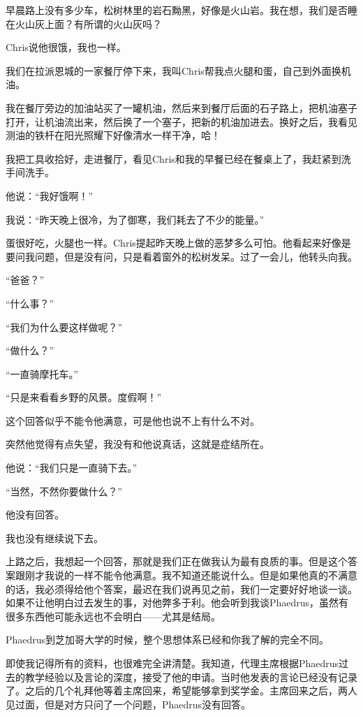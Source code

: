 \documentclass[UTF8]{article}
\begin{document}
\par 早晨路上没有多少车，松树林里的岩石黝黑，好像是火山岩。我在想，我们是否睡在火山灰上面？有所谓的火山灰吗？
\par Chris说他很饿，我也一样。
\par 我们在拉派恩城的一家餐厅停下来，我叫Chris帮我点火腿和蛋，自己到外面换机油。
\par 我在餐厅旁边的加油站买了一罐机油，然后来到餐厅后面的石子路上，把机油塞子打开，让机油流出来，然后换了一个塞子，把新的机油加进去。换好之后，我看见测油的铁杆在阳光照耀下好像清水一样干净，哈！
\par 我把工具收拾好，走进餐厅，看见Chris和我的早餐已经在餐桌上了，我赶紧到洗手间洗手。
\par 他说：“我好饿啊！”
\par 我说：“昨天晚上很冷，为了御寒，我们耗去了不少的能量。”
\par 蛋很好吃，火腿也一样。Chris提起昨天晚上做的恶梦多么可怕。他看起来好像是要问我问题，但是没有问，只是看着窗外的松树发呆。过了一会儿，他转头向我。
\par “爸爸？”
\par “什么事？”
\par “我们为什么要这样做呢？”
\par “做什么？”
\par “一直骑摩托车。”
\par “只是来看看乡野的风景。度假啊！”
\par 这个回答似乎不能令他满意，可是他也说不上有什么不对。
\par 突然他觉得有点失望，我没有和他说真话，这就是症结所在。
\par 他说：“我们只是一直骑下去。”
\par “当然，不然你要做什么？”
\par 他没有回答。
\par 我也没有继续说下去。
\par 上路之后，我想起一个回答，那就是我们正在做我认为最有良质的事。但是这个答案跟刚才我说的一样不能令他满意。我不知道还能说什么。但是如果他真的不满意的话，我必须得给他个答案，最迟在我们说再见之前，我们一定要好好地谈一谈。如果不让他明白过去发生的事，对他弊多于利。他会听到我谈Phaedrus，虽然有很多东西他可能永远也不会明白——尤其是结局。
\par Phaedrus到芝加哥大学的时候，整个思想体系已经和你我了解的完全不同。
\par 即使我记得所有的资料，也很难完全讲清楚。我知道，代理主席根据Phaedrus过去的教学经验以及言论的深度，接受了他的申请。当时他发表的言论已经没有记录了。之后的几个礼拜他等着主席回来，希望能够拿到奖学金。主席回来之后，两人见过面，但是对方只问了一个问题，Phaedrus没有回答。
\end{document}
